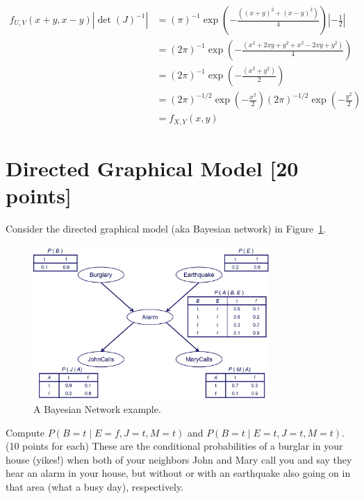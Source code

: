 \documentclass[a4paper]{article}
\theoremstyle{definition}
\newenvironment{soln}{
	\leavevmode\color{blue}\ignorespaces
}{}
\begin{document}
\begin{enumerate}[label=(\alph*)]
		\begin{soln}
			$$ \begin{aligned}
				f_{U,V}(x+y, x-y)|\det(J)^{-1}| & = (\pi)^{-1}\exp\left(-\frac{((x+y)^2+(x-y)^2)}{4}\right) |-\frac{1}{2}| \\
				& = (2\pi)^{-1}\exp\left(-\frac{(x^2+2xy+y^2+x^2-2xy+y^2)}{4}\right) \\
				& = (2\pi)^{-1}\exp\left(-\frac{(x^2+y^2)}{2}\right) \\
				& = (2\pi)^{-1/2}\exp\left(-\frac{x^2}{2}\right) (2\pi)^{-1/2}\exp\left(-\frac{y^2}{2}\right) \\
				& = f_{X,Y}(x, y)
			\end{aligned} $$
		\end{soln}
	\end{enumerate}

\section{Directed Graphical Model [20 points]}
Consider the directed graphical model (aka Bayesian network) in Figure~\ref{fig:bn}.
\begin{figure}[H]
    \centering
    \includegraphics[width=0.8\textwidth]{BN.jpg}
    \caption{A Bayesian Network example.}
    \label{fig:bn}
\end{figure}
Compute $P(B=t \mid E=f,J=t,M=t)$ and $P(B=t \mid E=t,J=t,M=t)$. (10 points for each) These are the conditional probabilities of a burglar in your house (yikes!) when both of your neighbors John and Mary call you and say they hear an alarm in your house, but without or with an earthquake also going on in that area (what a busy day), respectively.
\end{document}
